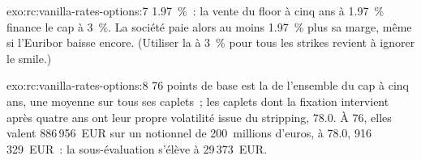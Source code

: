 \begin{solution}{exo:rc:vanilla-rates-options:7}
1.97~\%~: la vente du floor à cinq ans à 1.97~\% finance le cap à 3~\%. La
société paie alors au moins 1.97~\% plus sa marge, même si l'Euribor baisse
encore. (Utiliser la  à 3~\% pour tous les strikes revient à ignorer le smile.)
\end{solution}

\begin{solution}{exo:rc:vanilla-rates-options:8}
76 points de base est la  de l'ensemble du cap à cinq ans, une moyenne
sur tous ses caplets~; les caplets dont la fixation intervient après quatre ans ont leur
propre volatilité issue du stripping, 78.0. À 76, elles valent 886\,956~EUR sur un notionnel de 200~millions d'euros,
à 78.0, 916\,329~EUR~: la sous-évaluation s'élève à 29\,373~EUR.
\end{solution}

